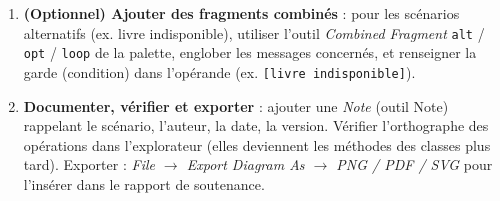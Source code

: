 \documentclass[11pt]{article}
\begin{document}
\begin{methode}
\begin{enumerate}
\begin{enumerate}
      \item \texttt{enregistrerEmprunt()} -- synchrone, \texttt{ecran} $\rightarrow$ \texttt{gestion} (nouvelle activation) ;
      \item \texttt{confirmationEmprunt} -- retour, \texttt{ecran} $\dashrightarrow$ \texttt{a} (fin activation \texttt{ecran}).
      \end{enumerate}
\item \textbf{(Optionnel) Ajouter des fragments combinés} : pour les scénarios alternatifs (ex. livre indisponible), utiliser l'outil \emph{Combined Fragment} \texttt{alt} / \texttt{opt} / \texttt{loop} de la palette, englober les messages concernés, et renseigner la garde (condition) dans l'opérande (ex. \texttt{[livre indisponible]}).
\item \textbf{Documenter, vérifier et exporter} : ajouter une \emph{Note} (outil Note) rappelant le scénario, l'auteur, la date, la version. Vérifier l'orthographe des opérations dans l'explorateur (elles deviennent les méthodes des classes plus tard). Exporter : \emph{File $\rightarrow$ Export Diagram As $\rightarrow$ PNG / PDF / SVG} pour l'insérer dans le rapport de soutenance.
\end{enumerate}
\end{methode}
\end{document}
